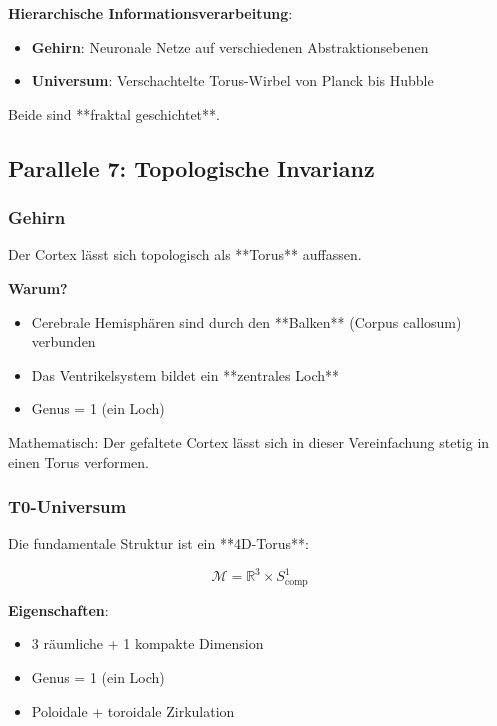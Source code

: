 	\begin{keyresult}
		\textbf{Hierarchische Informationsverarbeitung}:

		\begin{itemize}
			\item \textbf{Gehirn}: Neuronale Netze auf verschiedenen Abstraktionsebenen
			\item \textbf{Universum}: Verschachtelte Torus-Wirbel von Planck bis Hubble
		\end{itemize}

		Beide sind **fraktal geschichtet**.
	\end{keyresult}

	\subsection{Parallele 7: Topologische Invarianz}

	\subsubsection{Gehirn}

	Der Cortex lässt sich topologisch als **Torus** auffassen.

	\textbf{Warum?}
	\begin{itemize}
		\item Cerebrale Hemisphären sind durch den **Balken** (Corpus callosum) verbunden
		\item Das Ventrikelsystem bildet ein **zentrales Loch**
		\item Genus = 1 (ein Loch)
	\end{itemize}

	Mathematisch: Der gefaltete Cortex lässt sich in dieser Vereinfachung stetig in einen Torus verformen.

	\subsubsection{T0-Universum}

	Die fundamentale Struktur ist ein **4D-Torus**:

	\begin{equation}
		\mathcal{M} = \mathbb{R}^3 \times S^1_{\text{comp}}
	\end{equation}

	\textbf{Eigenschaften}:
	\begin{itemize}
		\item 3 räumliche + 1 kompakte Dimension
		\item Genus = 1 (ein Loch)
		\item Poloidale + toroidale Zirkulation
	\end{itemize}

